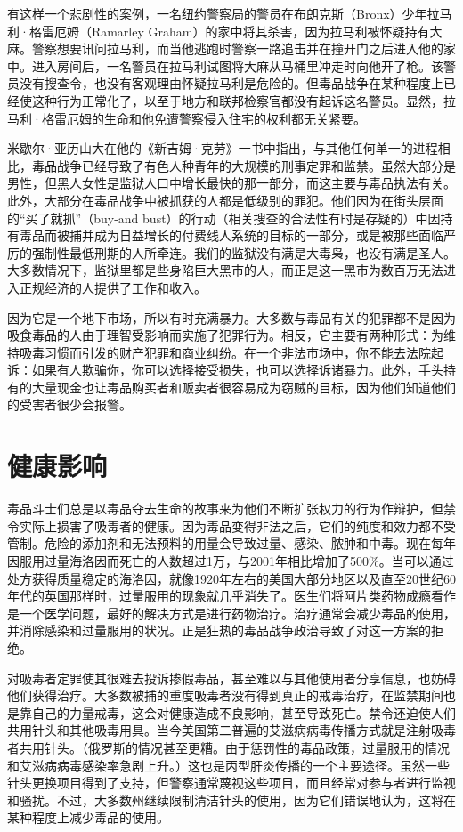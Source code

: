 \documentclass[fontset=fandol, a4paper, 12pt, openright]{ctexbook}
\begin{document}
有这样一个悲剧性的案例，一名纽约警察局的警员在布朗克斯（Bronx）少年拉马利·格雷厄姆（Ramarley Graham）的家中将其杀害，因为拉马利被怀疑持有大麻。警察想要讯问拉马利，而当他逃跑时警察一路追击并在撞开门之后进入他的家中。进入房间后，一名警员在拉马利试图将大麻从马桶里冲走时向他开了枪。该警员没有搜查令，也没有客观理由怀疑拉马利是危险的。但毒品战争在某种程度上已经使这种行为正常化了，以至于地方和联邦检察官都没有起诉这名警员。显然，拉马利·格雷厄姆的生命和他免遭警察侵入住宅的权利都无关紧要。

米歇尔·亚历山大在他的《新吉姆·克劳》一书中指出，与其他任何单一的进程相比，毒品战争已经导致了有色人种青年的大规模的刑事定罪和监禁。虽然大部分是男性，但黑人女性是监狱人口中增长最快的那一部分，而这主要与毒品执法有关。此外，大部分在毒品战争中被抓获的人都是低级别的罪犯。他们因为在街头层面的“买了就抓”（buy-and bust）的行动（相关搜查的合法性有时是存疑的）中因持有毒品而被捕并成为日益增长的付费线人系统的目标的一部分，或是被那些面临严厉的强制性最低刑期的人所牵连。我们的监狱没有满是大毒枭，也没有满是圣人。大多数情况下，监狱里都是些身陷巨大黑市的人，而正是这一黑市为数百万无法进入正规经济的人提供了工作和收入。

因为它是一个地下市场，所以有时充满暴力。大多数与毒品有关的犯罪都不是因为吸食毒品的人由于理智受影响而实施了犯罪行为。相反，它主要有两种形式：为维持吸毒习惯而引发的财产犯罪和商业纠纷。在一个非法市场中，你不能去法院起诉：如果有人欺骗你，你可以选择接受损失，也可以选择诉诸暴力。此外，手头持有的大量现金也让毒品购买者和贩卖者很容易成为窃贼的目标，因为他们知道他们的受害者很少会报警。

\section{健康影响}

毒品斗士们总是以毒品夺去生命的故事来为他们不断扩张权力的行为作辩护，但禁令实际上损害了吸毒者的健康。因为毒品变得非法之后，它们的纯度和效力都不受管制。危险的添加剂和无法预料的用量会导致过量、感染、脓肿和中毒。现在每年因服用过量海洛因而死亡的人数超过1万，与2001年相比增加了500\%。当可以通过处方获得质量稳定的海洛因，就像1920年左右的美国大部分地区以及直至20世纪60年代的英国那样时，过量服用的现象就几乎消失了。医生们将阿片类药物成瘾看作是一个医学问题，最好的解决方式是进行药物治疗。治疗通常会减少毒品的使用，并消除感染和过量服用的状况。正是狂热的毒品战争政治导致了对这一方案的拒绝。

对吸毒者定罪使其很难去投诉掺假毒品，甚至难以与其他使用者分享信息，也妨碍他们获得治疗。大多数被捕的重度吸毒者没有得到真正的戒毒治疗，在监禁期间也是靠自己的力量戒毒，这会对健康造成不良影响，甚至导致死亡。禁令还迫使人们共用针头和其他吸毒用具。当今美国第二普遍的艾滋病病毒传播方式就是注射吸毒者共用针头。（俄罗斯的情况甚至更糟。由于惩罚性的毒品政策，过量服用的情况和艾滋病病毒感染率急剧上升。）这也是丙型肝炎传播的一个主要途径。虽然一些针头更换项目得到了支持，但警察通常蔑视这些项目，而且经常对参与者进行监视和骚扰。不过，大多数州继续限制清洁针头的使用，因为它们错误地认为，这将在某种程度上减少毒品的使用。
\end{document}
